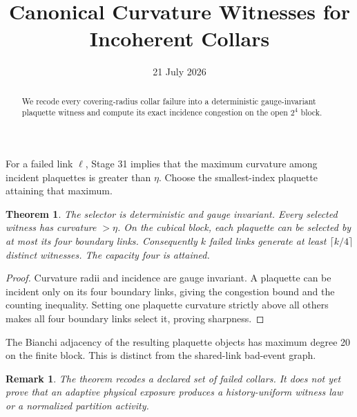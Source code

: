 \documentclass[11pt]{article}\usepackage[margin=1in]{geometry}\usepackage{amsmath,amsthm}\newtheorem{theorem}{Theorem}\newtheorem{remark}{Remark}
\title{Canonical Curvature Witnesses for Incoherent Collars}\author{}\date{21 July 2026}
\begin{document}
\maketitle
\begin{abstract}We recode every covering-radius collar failure into a deterministic gauge-invariant plaquette witness and compute its exact incidence congestion on the open $2^4$ block.\end{abstract}
For a failed link $\ell$, Stage 31 implies that the maximum curvature among incident plaquettes is greater than $\eta$. Choose the smallest-index plaquette attaining that maximum.
\begin{theorem}The selector is deterministic and gauge invariant. Every selected witness has curvature $>\eta$. On the cubical block, each plaquette can be selected by at most its four boundary links. Consequently $k$ failed links generate at least $\lceil k/4\rceil$ distinct witnesses. The capacity four is attained.\end{theorem}
\begin{proof}Curvature radii and incidence are gauge invariant. A plaquette can be incident only on its four boundary links, giving the congestion bound and the counting inequality. Setting one plaquette curvature strictly above all others makes all four boundary links select it, proving sharpness.\end{proof}
The Bianchi adjacency of the resulting plaquette objects has maximum degree 20 on the finite block. This is distinct from the shared-link bad-event graph.
\begin{remark}The theorem recodes a declared set of failed collars. It does not yet prove that an adaptive physical exposure produces a history-uniform witness law or a normalized partition activity.\end{remark}
\end{document}
